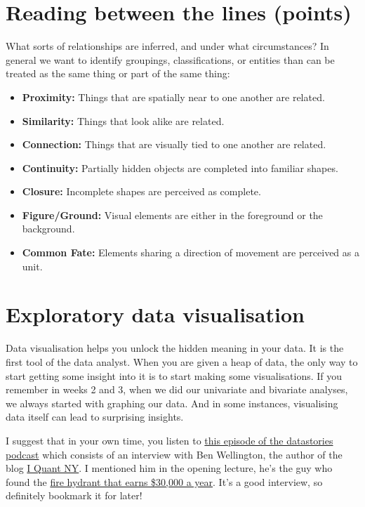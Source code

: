\documentclass[
]{book}
\providecommand{\tightlist}{%
  \setlength{\itemsep}{0pt}\setlength{\parskip}{0pt}}
\begin{document}
\hypertarget{reading-between-the-lines-points}{%
\section{Reading between the lines (points)}\label{reading-between-the-lines-points}}

What sorts of relationships are inferred, and under what circumstances? In general we want to identify groupings, classifications, or entities than can be treated as the same thing or part of the same thing:

\begin{itemize}
\tightlist
\item
  \textbf{Proximity:} Things that are spatially near to one another are related.
\item
  \textbf{Similarity:} Things that look alike are related.
\item
  \textbf{Connection:} Things that are visually tied to one another are related.
\item
  \textbf{Continuity:} Partially hidden objects are completed into familiar shapes.
\item
  \textbf{Closure:} Incomplete shapes are perceived as complete.
\item
  \textbf{Figure/Ground:} Visual elements are either in the foreground or the background.
\item
  \textbf{Common Fate:} Elements sharing a direction of movement are perceived as a unit.
\end{itemize}

\hypertarget{exploratory-data-visualisation}{%
\section{Exploratory data visualisation}\label{exploratory-data-visualisation}}

Data visualisation helps you unlock the hidden meaning in your data. It is the first tool of the data analyst. When you are given a heap of data, the only way to start getting some insight into it is to start making some visualisations. If you remember in weeks 2 and 3, when we did our univariate and bivariate analyses, we always started with graphing our data. And in some instances, visualising data itself can lead to surprising insights.

I suggest that in your own time, you listen to \href{http://datastori.es/66-iquantnyc/}{this episode of the datastories podcast} which consists of an interview with Ben Wellington, the author of the blog \href{http://iquantny.tumblr.com/}{I Quant NY}. I mentioned him in the opening lecture, he's the guy who found the \href{http://iquantny.tumblr.com/post/87573867759/success-how-nyc-open-data-and-reddit-saved-new}{fire hydrant that earns \$30,000 a year}. It's a good interview, so definitely bookmark it for later!
\end{document}
